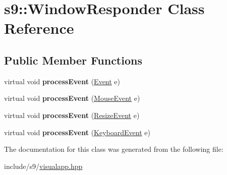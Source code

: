 \hypertarget{classs9_1_1WindowResponder}{\section{s9\-:\-:Window\-Responder Class Reference}
\label{classs9_1_1WindowResponder}
}
\subsection*{Public Member Functions}
\begin{DoxyCompactItemize}
\item 
\hypertarget{classs9_1_1WindowResponder_a8d0f74300c1bbc3107d48be8d41b2416}{virtual void {\bfseries process\-Event} (\hyperlink{structs9_1_1Event}{Event} e)}\label{classs9_1_1WindowResponder_a8d0f74300c1bbc3107d48be8d41b2416}

\item 
\hypertarget{classs9_1_1WindowResponder_a11fd04e73cc1ab1a02a494fdf5a566d2}{virtual void {\bfseries process\-Event} (\hyperlink{structs9_1_1MouseEvent}{Mouse\-Event} e)}\label{classs9_1_1WindowResponder_a11fd04e73cc1ab1a02a494fdf5a566d2}

\item 
\hypertarget{classs9_1_1WindowResponder_a9f272d8df1f0709586d8ed6f51133f87}{virtual void {\bfseries process\-Event} (\hyperlink{structs9_1_1ResizeEvent}{Resize\-Event} e)}\label{classs9_1_1WindowResponder_a9f272d8df1f0709586d8ed6f51133f87}

\item 
\hypertarget{classs9_1_1WindowResponder_a5ab3ad222e62d209332c40d0be44a373}{virtual void {\bfseries process\-Event} (\hyperlink{structs9_1_1KeyboardEvent}{Keyboard\-Event} e)}\label{classs9_1_1WindowResponder_a5ab3ad222e62d209332c40d0be44a373}

\end{DoxyCompactItemize}


The documentation for this class was generated from the following file\-:\begin{DoxyCompactItemize}
\item 
include/s9/\hyperlink{visualapp_8hpp}{visualapp.\-hpp}\end{DoxyCompactItemize}
